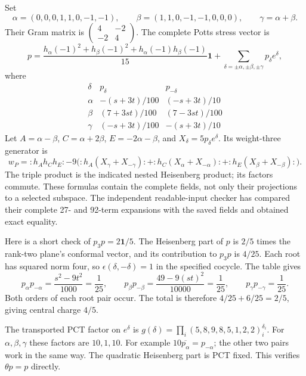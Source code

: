 Set
\[
 \alpha=(0,0,0,1,1,0,-1,-1),\qquad
 \beta=(1,1,0,-1,-1,0,0,0),\qquad \gamma=\alpha+\beta.
\]
Their Gram matrix is $\left(\begin{smallmatrix}4&-2\\-2&4\end{smallmatrix}\right)$.
The complete Potts stress vector is
\begin{equation}
 p=\frac{h_\alpha(-1)^2+h_\beta(-1)^2+
                 h_\alpha(-1)h_\beta(-1)}{15}\mathbf1
     +\sum_{\delta=\pm\alpha,\pm\beta,\pm\gamma}p_\delta e^\delta,
 \label{hr:potts-field}
\end{equation}
where
\[
\begin{array}{c|rr}
 \delta&p_\delta&p_{-\delta}\\\hline
 \alpha&-(s+3t)/100&(-s+3t)/10\\
 \beta&(7+3st)/100&(7-3st)/100\\
 \gamma&(-s+3t)/100&-(s+3t)/10
\end{array}
\]
Let $A=\alpha-\beta$, $C=\alpha+2\beta$, $E=-2\alpha-\beta$,
and $X_\delta=5p_\delta e^\delta$. Its weight-three generator is
\begin{equation}
 w_P=:h_Ah_Ch_E:
 -9\bigl(:h_A(X_\gamma+X_{-\gamma}):
       +:h_C(X_\alpha+X_{-\alpha}):
       +:h_E(X_\beta+X_{-\beta}):\bigr).
 \label{hr:potts-primary}
\end{equation}
The triple product is the indicated nested Heisenberg product; its
factors commute. These formulas contain the complete fields, not only
their projections to a selected subspace. The independent readable-input
checker has compared their complete 27- and 92-term expansions with
the saved fields and obtained exact equality.

Here is a short check of $p_3p=2\mathbf1/5$. The Heisenberg part of
$p$ is $2/5$ times the rank-two plane's conformal vector, and its
contribution to $p_3p$ is $4/25$. Each root has squared norm four,
so $\epsilon(\delta,-\delta)=1$ in the specified cocycle. The table
gives
\[
 p_\alpha p_{-\alpha}
   =\frac{s^2-9t^2}{1000}=\frac1{25},\qquad
 p_\beta p_{-\beta}
   =\frac{49-9(st)^2}{10000}=\frac1{25},\qquad
 p_\gamma p_{-\gamma}=\frac1{25}.
\]
Both orders of each root pair occur. The total is therefore
$4/25+6/25=2/5$, giving central charge $4/5$.

The transported PCT factor on $e^\delta$ is
$g(\delta)=\prod_i(5,8,9,8,5,1,2,2)_i^{\delta_i}$.
For $\alpha,\beta,\gamma$ these factors are $10,1,10$.
For example $10\overline{p_\alpha}=p_{-\alpha}$; the other
two pairs work in the same way. The quadratic Heisenberg part is
PCT fixed. This verifies $\theta p=p$ directly.

